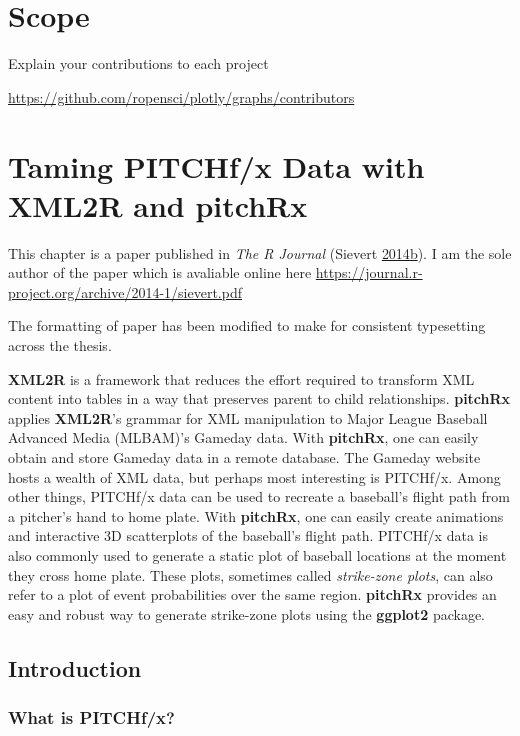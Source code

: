 \documentclass[12pt,]{isuthesis}
\begin{document}
\chapter{Scope}

Explain your contributions to each project

\url{https://github.com/ropensci/plotly/graphs/contributors}

\chapter{Taming PITCHf/x Data with XML2R and pitchRx}

This chapter is a paper published in \emph{The R Journal} (Sievert
\protect\hyperlink{ref-Sievert:2014a}{2014}\protect\hyperlink{ref-Sievert:2014a}{b}).
I am the sole author of the paper which is avaliable online here
\url{https://journal.r-project.org/archive/2014-1/sievert.pdf}

The formatting of paper has been modified to make for consistent
typesetting across the thesis.


\textbf{XML2R} is a framework that reduces the effort required to
transform XML content into tables in a way that preserves parent to
child relationships. \textbf{pitchRx} applies \textbf{XML2R}'s grammar
for XML manipulation to Major League Baseball Advanced Media (MLBAM)'s
Gameday data. With \textbf{pitchRx}, one can easily obtain and store
Gameday data in a remote database. The Gameday website hosts a wealth of
XML data, but perhaps most interesting is PITCHf/x. Among other things,
PITCHf/x data can be used to recreate a baseball's flight path from a
pitcher's hand to home plate. With \textbf{pitchRx}, one can easily
create animations and interactive 3D scatterplots of the baseball's
flight path. PITCHf/x data is also commonly used to generate a static
plot of baseball locations at the moment they cross home plate. These
plots, sometimes called \textit{strike-zone plots}, can also refer to a
plot of event probabilities over the same region. \textbf{pitchRx}
provides an easy and robust way to generate strike-zone plots using the
\textbf{ggplot2} package.

\section{Introduction}\label{introduction}

\subsection{What is PITCHf/x?}\label{what-is-pitchfx}
\end{document}
